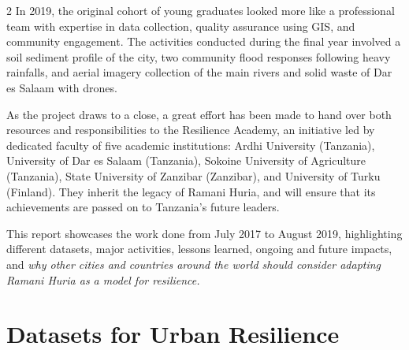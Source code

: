 \documentclass[a4paper,12pt,twoside]{article}
\begin{document}
\begin{multicols} {2}
In 2019, the original cohort of young graduates looked more like a professional team with expertise in data collection, quality assurance using GIS, and community engagement. The activities conducted during the final year involved a soil sediment profile of the city, two community flood responses following heavy rainfalls, and aerial imagery collection of the main rivers and solid waste of Dar es Salaam with drones. 

As the project draws to a close, a great effort has been made to hand over both resources and responsibilities to the Resilience Academy, an initiative led by dedicated faculty of five academic institutions: Ardhi University (Tanzania), University of Dar es Salaam (Tanzania), Sokoine University of Agriculture (Tanzania), State University of Zanzibar (Zanzibar), and University of Turku (Finland). They inherit the legacy of Ramani Huria, and will ensure that its achievements are passed on to Tanzania’s future leaders. 

This report showcases the work done from July 2017 to August 2019, highlighting different datasets, major activities, lessons learned, ongoing and future impacts, and \textit{why other cities and countries around the world should consider adapting Ramani Huria as a model for resilience.}

\end{multicols}

\newpage
\section{Datasets for Urban Resilience}
\end{document}
